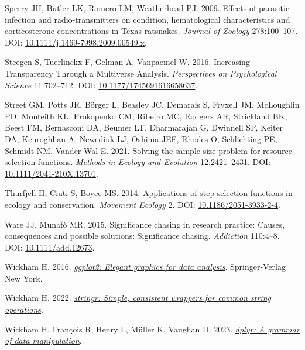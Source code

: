 \documentclass[10pt,a4paper]{article}
\newlength{\cslhangindent}
\newenvironment{CSLReferences}[2] %
 {\begin{list}{}{%
  \setlength{\itemindent}{0pt}
  \setlength{\leftmargin}{0pt}
  \setlength{\parsep}{0pt}
  \ifodd #1
   \setlength{\leftmargin}{\cslhangindent}
   \setlength{\itemindent}{-1\cslhangindent}
  \fi
  \setlength{\itemsep}{#2\baselineskip}}}
 {\end{list}}
\begin{document}
\begin{CSLReferences}{1}{0}
Sperry JH, Butler LK, Romero LM, Weatherhead PJ. 2009. Effects of parasitic infection and radio-transmitters on condition, hematological characteristics and corticosterone concentrations in {Texas} ratsnakes. \emph{Journal of Zoology} 278:100--107. DOI: \href{https://doi.org/10.1111/j.1469-7998.2009.00549.x}{10.1111/j.1469-7998.2009.00549.x}.

Steegen S, Tuerlinckx F, Gelman A, Vanpaemel W. 2016. Increasing {Transparency} {Through} a {Multiverse} {Analysis}. \emph{Perspectives on Psychological Science} 11:702--712. DOI: \href{https://doi.org/10.1177/1745691616658637}{10.1177/1745691616658637}.

Street GM, Potts JR, Börger L, Beasley JC, Demarais S, Fryxell JM, McLoughlin PD, Monteith KL, Prokopenko CM, Ribeiro MC, Rodgers AR, Strickland BK, Beest FM, Bernasconi DA, Beumer LT, Dharmarajan G, Dwinnell SP, Keiter DA, Keuroghlian A, Newediuk LJ, Oshima JEF, Rhodes O, Schlichting PE, Schmidt NM, Vander Wal E. 2021. Solving the sample size problem for resource selection functions. \emph{Methods in Ecology and Evolution} 12:2421--2431. DOI: \href{https://doi.org/10.1111/2041-210X.13701}{10.1111/2041-210X.13701}.

Thurfjell H, Ciuti S, Boyce MS. 2014. Applications of step-selection functions in ecology and conservation. \emph{Movement Ecology} 2. DOI: \href{https://doi.org/10.1186/2051-3933-2-4}{10.1186/2051-3933-2-4}.

Ware JJ, Munafò MR. 2015. Significance chasing in research practice: Causes, consequences and possible solutions: {Significance} chasing. \emph{Addiction} 110:4--8. DOI: \href{https://doi.org/10.1111/add.12673}{10.1111/add.12673}.

Wickham H. 2016. \emph{\href{https://ggplot2.tidyverse.org}{ggplot2: Elegant graphics for data analysis}}. Springer-Verlag New York.

Wickham H. 2022. \emph{\href{https://CRAN.R-project.org/package=stringr}{{stringr}: Simple, consistent wrappers for common string operations}}.

Wickham H, François R, Henry L, Müller K, Vaughan D. 2023. \emph{\href{https://CRAN.R-project.org/package=dplyr}{{dplyr}: A grammar of data manipulation}}.


\end{CSLReferences}
\end{document}
